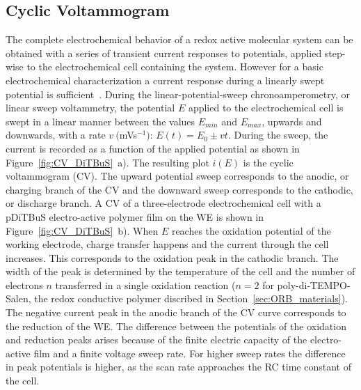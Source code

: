\subsection{Cyclic Voltammogram}
The complete electrochemical behavior of a redox active molecular system can be obtained with a series of transient current responses to potentials, applied step-wise to the electrochemical cell containing the system. However for a basic electrochemical characterization a current response during a linearly swept potential is sufficient~\cite{Bard_book}. During the linear-potential-sweep chronoamperometry, or linear sweep voltammetry, the potential $E$ applied to the electrochemical cell is swept in a linear manner between the values $E_{min}$ and $E_{max}$, upwards and downwards, with a rate $v~($mVs$^{-1})$: $E(t) = E_0\pm vt$. During the sweep, the current is recorded as a function of the applied potential as shown in Figure~\ref{fig:CV_DiTBuS}~a). The resulting plot $i(E)$ is the cyclic voltammogram (CV). The upward potential sweep corresponds to the anodic, or charging branch of the CV and the downward sweep corresponds to the cathodic, or discharge branch. A CV of a three-electrode electrochemical cell with a pDiTBuS electro-active polymer film on the WE is shown in Figure~\ref{fig:CV_DiTBuS}~b). When $E$ reaches the oxidation potential of the working electrode, charge transfer happens and the current through the cell increases. This corresponds to the oxidation peak in the cathodic branch. The width of the peak is determined by the temperature of the cell and the number of electrons $n$ transferred in a single oxidation reaction ($n=2$ for poly-di-TEMPO-Salen, the redox conductive polymer discribed in Section~\ref{sec:ORB_materials}). The negative current peak in the anodic branch of the CV curve corresponds to the reduction of the WE. The difference between the potentials of the oxidation and reduction peaks arises because of the finite electric capacity of the electro-active film and a finite voltage sweep rate. For higher sweep rates the difference in peak potentials is higher, as the scan rate approaches the RC time constant of the cell.

